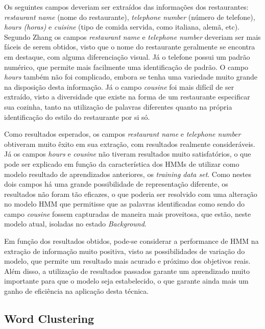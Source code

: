 \begin{textonovo}
Os seguintes campos deveriam ser extraídos das informações dos restaurantes: \textit{restaurant name} (nome do restaurante), \textit{telephone number} (número de telefone), \textit{hours (horas)} e \textit{cuisine} (tipo de comida servida, como italiana, alemã, etc). Segundo Zhang \cite{Zhang-HMM-IE} os campos \textit{restaurant name} e \textit{telephone number} deveriam ser mais fáceis de serem obtidos, visto que o nome do restaurante geralmente se encontra em destaque, com alguma diferenciação visual. Já o telefone possui um padrão numérico, que permite mais facilmente uma identificação de padrão. O campo \textit{hours} também não foi complicado, embora se tenha uma variedade muito grande na disposição desta informação. Já o campo \textit{cousine} foi mais difícil de ser extraído, visto a diversidade que existe na forma de um restaurante especificar sua cozinha, tanto na utilização de palavras diferentes quanto na própria identificação do estilo do restaurante por si só.

Como resultados esperados, os campos \textit{restaurant name} e \textit{telephone number} obtiveram muito êxito em sua extração, com resultados realmente consideráveis. Já os campos \textit{hours} e \textit{cousine} não tiveram resultados muito satisfatórios, o que pode ser  explicado em função da característica dos HMMs de utilizar como modelo resultado de aprendizados anteriores, os \textit{training data set}. Como nestes dois campos há uma grande possibilidade de representação diferente, os resultados não foram tão eficazes, o que poderia ser resolvido com uma alteração no modelo HMM que permitisse que as palavras identificadas como sendo do campo \textit{cousine} fossem capturadas de maneira mais proveitosa, que estão, neste modelo atual, isoladas no estado \textit{Background}.

Em função dos resultados obtidos, pode-se considerar a performance de HMM na extração de informação muito positiva, visto as possibilidades de variação do modelo, que permite um resultado mais acurado e próximo dos objetivos reais. Além disso, a utilização de resultados passados garante um aprendizado muito importante para que o modelo seja estabelecido, o que garante ainda mais um ganho de eficiência na aplicação desta técnica.

\end{textonovo}



\subsection{Word Clustering}

